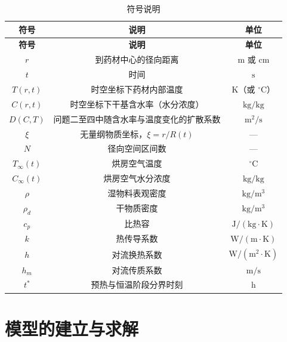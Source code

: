 \documentclass[12pt,a4paper]{article}
\begin{document}
\begin{longtable}{@{\extracolsep{\fill}}ccc@{}}
    \caption{符号说明}
    \label{tab:symbols} \\

    \hline
    \textbf{符号} & \textbf{说明} & \textbf{单位} \\
    \hline
    \endfirsthead

    \hline
    \textbf{符号} & \textbf{说明} & \textbf{单位} \\
    \hline
    \endhead

    \renewcommand{\arraystretch}{1.5}
    \setlength{\tabcolsep}{1.2em}

    $r$ & 到药材中心的径向距离 & $\mathrm{m}$ 或 $\mathrm{cm}$ \\
    $t$ & 时间 & $\mathrm{s}$ \\
    $T(r,t)$ & 时空坐标下药材内部温度 & $\mathrm{K}$（或 $^\circ\mathrm{C}$） \\
    $C(r,t)$ & 时空坐标下干基含水率（水分浓度） & $\mathrm{kg/kg}$ \\
    $D(C,T)$ & 问题二至四中随含水率与温度变化的扩散系数 & $\mathrm{m^2/s}$ \\
    $\xi$ & 无量纲物质坐标，$\xi=r/R(t)$ & — \\
    $N$ & 径向空间区间数 & — \\
    $T_\infty(t)$ & 烘房空气温度 & $^\circ\mathrm{C}$ \\
    $C_\infty(t)$ & 烘房空气水分浓度 & $\mathrm{kg/kg}$ \\
    $\rho$ & 湿物料表观密度 & $\mathrm{kg/m^3}$ \\
    $\rho_d$ & 干物质密度 & $\mathrm{kg/m^3}$ \\
    $c_p$ & 比热容 & $\mathrm{J/(kg\cdot K)}$ \\
    $k$ & 热传导系数 & $\mathrm{W/(m\cdot K)}$ \\
    $h$ & 对流换热系数 & $\mathrm{W/(m^2\cdot K)}$ \\
    $h_m$ & 对流传质系数 & $\mathrm{m/s}$ \\
    $t^*$ & 预热与恒温阶段分界时刻 & $\mathrm{h}$ \\

    \hline
\end{longtable}

\section{模型的建立与求解}
\end{document}
